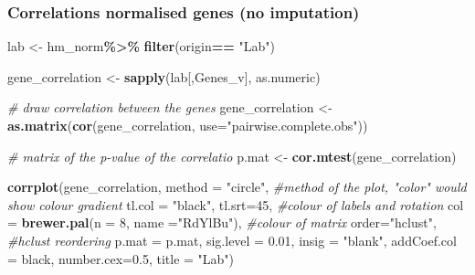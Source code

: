 \documentclass[
]{article}
\newenvironment{Shaded}{\begin{snugshade}}{\end{snugshade}}
\newcommand{\AttributeTok}[1]{\textcolor[rgb]{0.13,0.29,0.53}{#1}}
\newcommand{\CommentTok}[1]{\textcolor[rgb]{0.56,0.35,0.01}{\textit{#1}}}
\newcommand{\DecValTok}[1]{\textcolor[rgb]{0.00,0.00,0.81}{#1}}
\newcommand{\FloatTok}[1]{\textcolor[rgb]{0.00,0.00,0.81}{#1}}
\newcommand{\FunctionTok}[1]{\textcolor[rgb]{0.13,0.29,0.53}{\textbf{#1}}}
\newcommand{\NormalTok}[1]{#1}
\newcommand{\OtherTok}[1]{\textcolor[rgb]{0.56,0.35,0.01}{#1}}
\newcommand{\SpecialCharTok}[1]{\textcolor[rgb]{0.81,0.36,0.00}{\textbf{#1}}}
\newcommand{\StringTok}[1]{\textcolor[rgb]{0.31,0.60,0.02}{#1}}
\begin{document}
\hypertarget{correlations-normalised-genes-no-imputation}{%
\subsubsection{Correlations normalised genes (no
imputation)}\label{correlations-normalised-genes-no-imputation}}

\begin{Shaded}
\begin{Highlighting}[]
\NormalTok{lab }\OtherTok{\textless{}{-}}\NormalTok{ hm\_norm}\SpecialCharTok{\%\textgreater{}\%}
    \FunctionTok{filter}\NormalTok{(origin}\SpecialCharTok{==} \StringTok{"Lab"}\NormalTok{)}

\NormalTok{gene\_correlation }\OtherTok{\textless{}{-}} \FunctionTok{sapply}\NormalTok{(lab[,Genes\_v], as.numeric)}

\CommentTok{\# draw correlation between the genes}
\NormalTok{gene\_correlation }\OtherTok{\textless{}{-}} \FunctionTok{as.matrix}\NormalTok{(}\FunctionTok{cor}\NormalTok{(gene\_correlation, }
                                  \AttributeTok{use=}\StringTok{"pairwise.complete.obs"}\NormalTok{))}

\CommentTok{\# matrix of the p{-}value of the correlatio}
\NormalTok{p.mat }\OtherTok{\textless{}{-}} \FunctionTok{cor.mtest}\NormalTok{(gene\_correlation)}

\FunctionTok{corrplot}\NormalTok{(gene\_correlation, }
         \AttributeTok{method =} \StringTok{"circle"}\NormalTok{,  }\CommentTok{\#method of the plot, "color" would show colour gradient}
         \AttributeTok{tl.col =} \StringTok{"black"}\NormalTok{, }\AttributeTok{tl.srt=}\DecValTok{45}\NormalTok{, }\CommentTok{\#colour of labels and rotation}
         \AttributeTok{col =} \FunctionTok{brewer.pal}\NormalTok{(}\AttributeTok{n =} \DecValTok{8}\NormalTok{, }\AttributeTok{name =}\StringTok{"RdYlBu"}\NormalTok{), }\CommentTok{\#colour of matrix}
         \AttributeTok{order=}\StringTok{"hclust"}\NormalTok{, }\CommentTok{\#hclust reordering}
         \AttributeTok{p.mat =}\NormalTok{ p.mat, }\AttributeTok{sig.level =} \FloatTok{0.01}\NormalTok{, }\AttributeTok{insig =} \StringTok{"blank"}\NormalTok{,}
         \AttributeTok{addCoef.col =} \StringTok{\textquotesingle{}black\textquotesingle{}}\NormalTok{,}
         \AttributeTok{number.cex=}\FloatTok{0.5}\NormalTok{,}
         \AttributeTok{title =} \StringTok{"Lab"}\NormalTok{) }
\end{Highlighting}
\end{Shaded}
\end{document}

